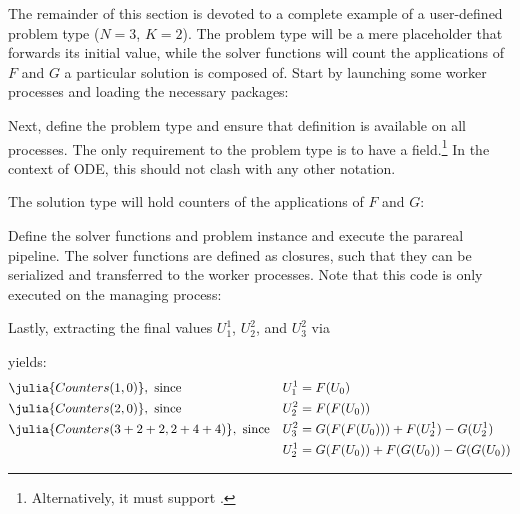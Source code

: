 \def\sk{\textsuperscript{k}}
\def\skmi{\textsuperscript{k-1}}


The remainder of this section is devoted to a complete example of a user-defined problem type ($N=3$, $K=2$).
The problem type will be a mere placeholder that forwards its initial value,
while the solver functions will count the applications of $F$ and $G$ a particular solution is composed of.
Start by launching some worker processes and loading the necessary packages:

Next, define the problem type and ensure that definition is available on all processes.
The only requirement to the problem type is to have a  field.\footnote{%
  Alternatively, it must support .
}
In the context of \ac{ODE}, this should not clash with any other notation.
\addtocounter{lstnumber}{1} %

The solution type will hold counters of the applications of $F$ and $G$:

Define the solver functions and problem instance and execute the parareal pipeline.
The solver functions are defined as closures,
such that they can be serialized and transferred to the worker processes.
Note that this code is only executed on the managing process:

Lastly, extracting the final values $U_1^1$, $U_2^2$, and $U_3^2$ via

yields:
\begin{align*}
  &\julia{Counters(1,0)}, \text{ since} &
  U_1^1 &= F(U_0) \\
  &\julia{Counters(2,0)}, \text{ since} &
  U_2^2 &= F(F(U_0)) \\
  &\julia{Counters(3+2+2,2+4+4)}, \text{ since} &
  U_3^2 &= G(F(F(U_0))) + F(U_2^1) - G(U_2^1) \\
  && U_2^1 &= G(F(U_0)) + F(G(U_0)) - G(G(U_0))
\end{align*}

